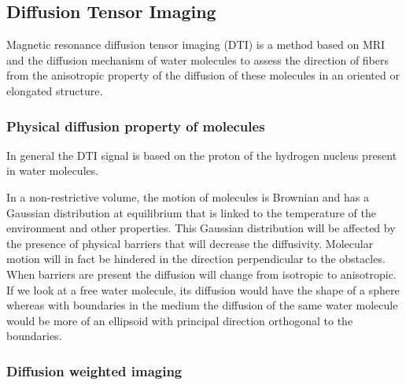 \subsection{Diffusion Tensor Imaging}

Magnetic resonance diffusion tensor imaging (DTI) is a method based on MRI and the diffusion mechanism of water molecules to assess the direction of fibers from the anisotropic property of the diffusion of these molecules in an oriented or elongated structure.

\subsubsection{Physical diffusion property of molecules}

In general the DTI signal is based on the proton of the hydrogen nucleus present in water molecules.

In a non-restrictive volume, the motion of molecules is Brownian and has a Gaussian distribution at equilibrium that is linked to the temperature of the environment and other properties. This Gaussian distribution will be affected by the presence of physical barriers that will decrease the diffusivity. Molecular motion will in fact be hindered in the direction perpendicular to the obstacles. When barriers are present the diffusion will change from isotropic to anisotropic. If we look at a free water molecule, its diffusion would have the shape of a sphere whereas with boundaries in the medium the diffusion of the same water molecule would be more of an ellipsoid with principal direction orthogonal to the boundaries.

\subsubsection{Diffusion weighted imaging} \label{dw_imaging}

